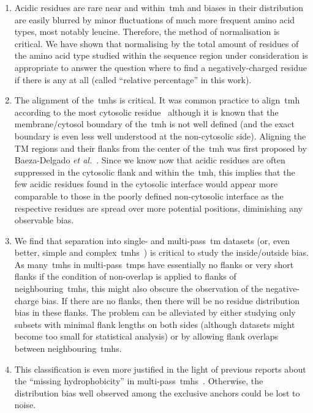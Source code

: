 \begin{enumerate}[i]
  \item Acidic residues are rare near and within~\gls{tmh} and biases in their distribution are easily blurred by minor fluctuations of much more frequent amino acid types, most notably leucine.
Therefore, the method of normalisation is critical.
We have shown that normalising by the total amount of residues of the amino acid type studied within the sequence region under consideration is appropriate to answer the question where to find a negatively\--charged residue if there is any at all (called ``relative percentage'' in this work).
  \item The alignment of the~\gls{tmh}s is critical.
It was common practice to align~\gls{tmh} according to the most cytosolic residue~\cite{Sharpe2010} although it is known that the membrane/cytosol boundary of the~\gls{tmh} is not well defined (and the exact boundary is even less well understood at the non-cytosolic side).
Aligning the TM regions and their flanks from the center of the~\gls{tmh} was first proposed by Baeza-Delgado \textit{et al.}~\cite{Baeza-Delgado2013}.
Since we know now that acidic residues are often suppressed in the cytosolic flank and within the~\gls{tmh}, this implies that the few acidic residues found in the cytosolic interface would appear more comparable to those in the poorly defined non-cytosolic interface as the respective residues are spread over more potential positions, diminishing any observable bias.
  \item We find that separation into single- and multi\--pass~\gls{tm} datasets (or, even better, simple and complex~\gls{tmh}s~\cite{Wong2011, Wong2012}) is critical to study the inside/outside bias.
As many~\gls{tmh}s in multi\--pass~\gls{tmp}s have essentially no flanks or very short flanks if the condition of non-overlap is applied to flanks of neighbouring~\gls{tmh}s, this might also obscure the observation of the negative\--charge bias.
If there are no flanks, then there will be no residue distribution bias in these flanks.
The problem can be alleviated by either studying only subsets with minimal flank lengths on both sides (although datasets might become too small for statistical analysis) or by allowing flank overlaps between neighbouring~\gls{tmh}s.
  \item This classification is even more justified in the light of previous reports about the ``missing hydrophobicity'' in multi\--pass~\gls{tmh}s~\cite{Nilsson1990, Hedin2010, Hessa2007, Ojemalm2012}.
Otherwise, the distribution bias well observed among the exclusive anchors could be lost to noise.

\end{enumerate}
